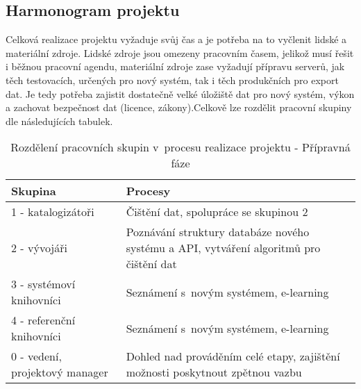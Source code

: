 \documentclass[
	11pt, oneside, printed, draft, 
	table,   %
	lof,     %
	lot     %
]{fithesis3}
\newcommand{\bold}[1]{\textbf{#1}}
\begin{document}
{\subsection{Harmonogram projektu}
Celková realizace projektu vyžaduje svůj čas a je potřeba na to vyčlenit lidské a materiální zdroje. Lidské zdroje jsou omezeny pracovním časem, jelikož musí řešit i běžnou pracovní agendu, materiální zdroje zase vyžadují přípravu serverů, jak těch testovacích, určených pro nový systém, tak i těch produkčních pro export dat. Je tedy potřeba zajistit dostatečně velké úložiště dat pro nový systém, výkon a zachovat bezpečnost dat (licence, zákony).Celkově lze rozdělit pracovní skupiny dle následujících tabulek.

\begin{table}[c]
    \centering
    \begin{tabular}{| p{3cm} | p{8.3cm} |}
    \hline
    \bold{Skupina} 	
    & 
    \bold{Procesy} 
    \\ \hline
    
    1 - katalogizátoři 
    & 
    Čištění dat, spolupráce se skupinou 2 
    \\ \hline
    
    2 - vývojáři 
    & 
	Poznávání struktury databáze nového systému a API, vytváření algoritmů pro čištění dat	
    \\ \hline
    
    3 - systémoví knihovníci
    & 
    Seznámení s~novým systémem, e-learning
    \\ \hline
    
    4 - referenční knihovníci
    & 
    Seznámení s~novým systémem, e-learning
    \\ \hline

	0 - vedení, projektový manager
    & 
    Dohled nad prováděním celé etapy, zajištění možnosti poskytnout zpětnou vazbu
    \\ \hline
    
    \end{tabular}
    \caption{Rozdělení pracovních skupin v~procesu realizace projektu - Přípravná fáze}
\end{table}
    
}
\end{document}
